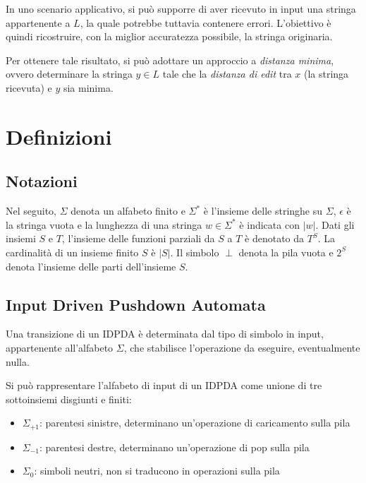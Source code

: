 \documentclass[a4paper,12pt]{report}
\theoremstyle{propositionstyle}
\begin{document}
    In uno scenario applicativo, si può supporre di aver ricevuto in input una stringa appartenente a $L$, la quale potrebbe tuttavia contenere errori.
    L'obiettivo è quindi ricostruire, con la miglior accuratezza possibile, la stringa originaria.

    Per ottenere tale risultato, si può adottare un approccio a \emph{distanza minima}, ovvero determinare la stringa $y \in L$ tale che la \textit{distanza di edit} tra $x$ (la stringa ricevuta) e $y$ sia minima.

    \chapter{Definizioni}

    \section{Notazioni}
    
    Nel seguito, $\Sigma$ denota un alfabeto finito e $\Sigma^*$ è l'insieme delle stringhe su $\Sigma$, $\epsilon$ è la stringa vuota e la lunghezza di una stringa $w \in \Sigma^*$ è indicata con $|w|$. Dati gli insiemi $S$ e $T$, l'insieme delle funzioni parziali da $S$ a $T$ è denotato da $T^S$. La cardinalità di un insieme finito $S$ è $|S|$. Il simbolo $\perp$ denota la pila vuota e $2^S$ denota l'insieme delle parti dell'insieme $S$.

    \section{Input Driven Pushdown Automata}

    Una transizione di un IDPDA è determinata dal tipo di simbolo in input, appartenente all'alfabeto $\Sigma$, che stabilisce l'operazione da eseguire, eventualmente nulla.
    
    Si può rappresentare l'alfabeto di input di un IDPDA come unione di tre sottoinsiemi disgiunti e finiti:

    \begin{itemize}
        \item $\Sigma_{+1}$: parentesi sinistre, determinano un'operazione di caricamento sulla pila
        \item $\Sigma_{-1}$: parentesi destre, determinano un'operazione di pop sulla pila
        \item $\Sigma_{0}$: simboli neutri, non si traducono in operazioni sulla pila
    \end{itemize}
\end{document}
